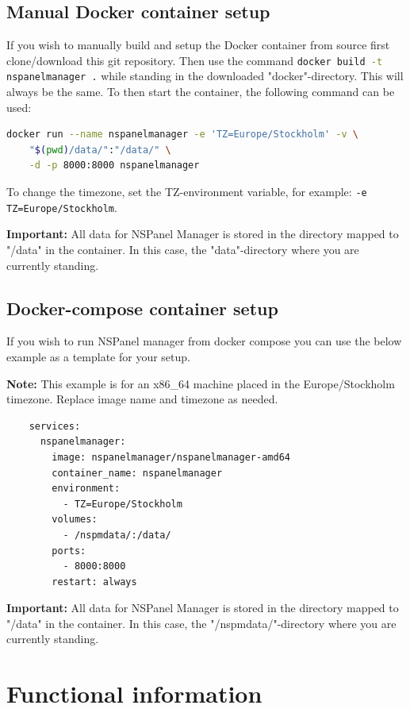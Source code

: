 \documentclass[10pt]{article}
\newcommand{\note}[1]{\begin{noteBox} \textbf{Note:} #1 \end{noteBox}}
\newcommand{\important}[1]{\begin{importantBox} \textbf{Important:} #1 \end{importantBox}}
\begin{document}
    \subsection{Manual Docker container setup}
    If you wish to manually build and setup the Docker container from source first clone/download this git repository. Then use the command \lstinline[language=bash]{docker build -t nspanelmanager .} while standing in the downloaded "docker"-directory. This will always be the same. To then start the container, the following command can be used:
    \begin{lstlisting}[language=bash]
    docker run --name nspanelmanager -e 'TZ=Europe/Stockholm' -v \
    "$(pwd)/data/":"/data/" \
    -d -p 8000:8000 nspanelmanager
    \end{lstlisting}
    To change the timezone, set the TZ-environment variable, for example: \lstinline[language=bash]{-e TZ=Europe/Stockholm}.
    \important{All data for NSPanel Manager is stored in the directory mapped to "/data" in the container. In this case, the "data"-directory where you are currently standing.}


    \subsection{Docker-compose container setup}
    If you wish to run NSPanel manager from docker compose you can use the below example as a template for your setup.
    \note{This example is for an x86\_64 machine placed in the Europe/Stockholm timezone. Replace image name and timezone as needed.}
    \begin{lstlisting}
    services:
      nspanelmanager:
        image: nspanelmanager/nspanelmanager-amd64
        container_name: nspanelmanager
        environment:
          - TZ=Europe/Stockholm
        volumes:
          - /nspmdata/:/data/
        ports:
          - 8000:8000
        restart: always
    \end{lstlisting}
    \important{All data for NSPanel Manager is stored in the directory mapped to "/data" in the container. In this case, the "/nspmdata/"-directory where you are currently standing.}

    \clearpage
    \section{Functional information}
    \label{sec:software_components}
\end{document}
